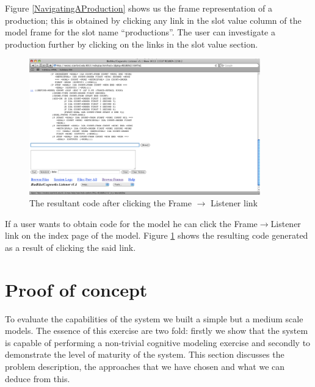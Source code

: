Figure \ref{NavigatingAProduction} shows us the frame representation
of a production; this is obtained by clicking any link in the slot
value column of the model frame for the slot name ``productions''. The
user can investigate a production further by clicking on the links in
the slot value section. 

\begin{figure}[htp]
  \centering
  \includegraphics[width=100mm]{ConvertFrameToImage}
  \caption{The resultant code after clicking the Frame $\rightarrow$ Listener
    link}
  \label{ConvertFrameToImage}
\end{figure}

If a user wants to obtain code for the model he can click the
Frame$\rightarrow$Listener link on the index page of the model. Figure
\ref{ConvertFrameToImage} shows the resulting code generated as a
result of clicking the said link.


\section{Proof of concept}





To evaluate the capabilities of the system we built a simple but a
medium scale models. The essence of this exercise are two fold:
firstly we show that the system is capable of performing a non-trivial
cognitive modeling exercise and secondly to demonstrate the level of
maturity of the system. This section discusses the problem description,
the approaches that we have chosen and what we can deduce from this.

